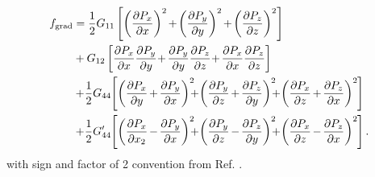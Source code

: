 \documentclass[22pt]{article} %
\begin{document}
\begin{align}\nonumber
f_\mathrm{grad} &= \frac{1}{2} G_{11} \left[\left(\frac{\partial P_x}{\partial x} \right)^2 \hspace{-1pt}+\hspace{-1pt} \left(\frac{\partial P_y}{\partial y}\right)^2 \hspace{-1pt}+\hspace{-1pt}\left( \frac{\partial P_z}{\partial z} \right)^2\right] \\ \nonumber
&+ G_{12} \left[\frac{\partial P_x}{\partial x}\frac{\partial P_y}{\partial y}\hspace{-2pt} +\hspace{-1pt} \frac{\partial P_y}{\partial y} \frac{\partial P_z}{\partial z}\hspace{-2pt} +\hspace{-1pt} \frac{\partial P_x}{\partial x} \frac{\partial P_z}{\partial z} \right] \\ \nonumber
&+ \hspace{-2pt} \frac{1}{2} G_{44}  \hspace{-2pt}\left[\left(\frac{\partial P_x}{\partial y} \hspace{-1pt}+ \hspace{-1pt} \frac{\partial P_y}{\partial x} \right)^2 \hspace{-6pt}+\hspace{-2pt} \left(\frac{\partial P_y}{\partial z} \hspace{-1pt}+ \hspace{-1pt}\frac{\partial P_z}{\partial y} \right)^2 \hspace{-6pt}+\hspace{-2pt} \left(\frac{\partial P_x}{\partial z} \hspace{-1pt}+\hspace{-1pt} \frac{\partial P_z}{\partial x} \right)^2  \hspace{-0.5pt}\right] \\ \nonumber
&+ \hspace{-2pt}\frac{1}{2} G'_{44} \hspace{-2pt}\left[\left(\frac{\partial P_x}{\partial x_2} \hspace{-1pt}- \hspace{-1pt}\frac{\partial P_y}{\partial x} \right)^2 \hspace{-6pt} + \hspace{-2pt} \left(\frac{\partial P_y}{\partial z}\hspace{-1pt} - \hspace{-1pt}\frac{\partial P_z}{\partial y} \right)^2 \hspace{-6pt}+  \hspace{-2pt}\left(\frac{\partial P_x}{\partial z}\hspace{-1pt} - \hspace{-1pt}\frac{\partial P_z}{\partial x} \right)^2 \hspace{-0.5pt} \right].
\end{align}
%
with sign and factor of 2 convention from Ref. \cite{Li2001, Hlinka2006}.
\end{document}
